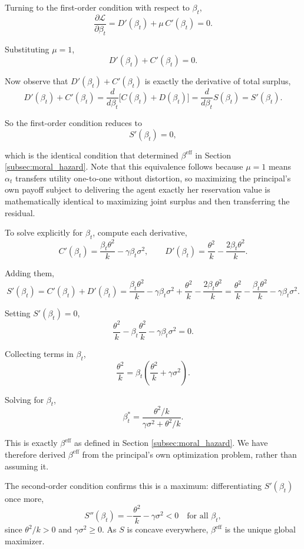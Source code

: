 \documentclass{article}
\theoremstyle{definition}
\theoremstyle{plain}
\begin{document}
Turning to the first-order condition with respect to $\beta_t$,
\[
\frac{\partial \mathcal{L}}{\partial \beta_t} = D'(\beta_t) + \mu\, C'(\beta_t) = 0.
\]

Substituting $\mu = 1$,
\[
D'(\beta_t) + C'(\beta_t) = 0.
\]

Now observe that $D'(\beta_t) + C'(\beta_t)$ is exactly the derivative of total surplus,
\[
D'(\beta_t) + C'(\beta_t) = \frac{d}{d\beta_t}\Big[C(\beta_t) + D(\beta_t)\Big] = \frac{d}{d\beta_t}S(\beta_t) = S'(\beta_t).
\]

So the first-order condition reduces to
\[
S'(\beta_t) = 0,
\]

which is the identical condition that determined $\beta^{\text{eff}}$ in Section \ref{subsec:moral_hazard}. Note that this equivalence follows because $\mu = 1$ means $\alpha_t$ transfers utility one-to-one without distortion, so maximizing the principal's own payoff subject to delivering the agent exactly her reservation value is mathematically identical to maximizing joint surplus and then transferring the residual.

To solve explicitly for $\beta_t$, compute each derivative,
\[
C'(\beta_t) = \frac{\beta_t\theta^2}{k} - \gamma\beta_t\sigma^2, \qquad D'(\beta_t) = \frac{\theta^2}{k} - \frac{2\beta_t\theta^2}{k}.
\]

Adding them,
\[
S'(\beta_t) = C'(\beta_t) + D'(\beta_t) = \frac{\beta_t\theta^2}{k} - \gamma\beta_t\sigma^2 + \frac{\theta^2}{k} - \frac{2\beta_t\theta^2}{k} = \frac{\theta^2}{k} - \frac{\beta_t\theta^2}{k} - \gamma\beta_t\sigma^2.
\]

Setting $S'(\beta_t) = 0$,
\[
\frac{\theta^2}{k} - \beta_t\frac{\theta^2}{k} - \gamma\beta_t\sigma^2 = 0.
\]

Collecting terms in $\beta_t$,
\[
\frac{\theta^2}{k} = \beta_t\left(\frac{\theta^2}{k} + \gamma\sigma^2\right).
\]

Solving for $\beta_t$,
\[
\beta_t^* = \frac{\theta^2/k}{\gamma\sigma^2 + \theta^2/k}.
\]

This is exactly $\beta^{\text{eff}}$ as defined in Section \ref{subsec:moral_hazard}. We have therefore derived $\beta^{\text{eff}}$ from the principal's own optimization problem, rather than assuming it.

The second-order condition confirms this is a maximum: differentiating $S'(\beta_t)$ once more,
\[
S''(\beta_t) = -\frac{\theta^2}{k} - \gamma\sigma^2 < 0 \quad \text{for all } \beta_t,
\]
since $\theta^2/k > 0$ and $\gamma\sigma^2 \geq 0$. As $S$ is concave everywhere, $\beta^{\text{eff}}$ is the unique global maximizer.
\end{document}
